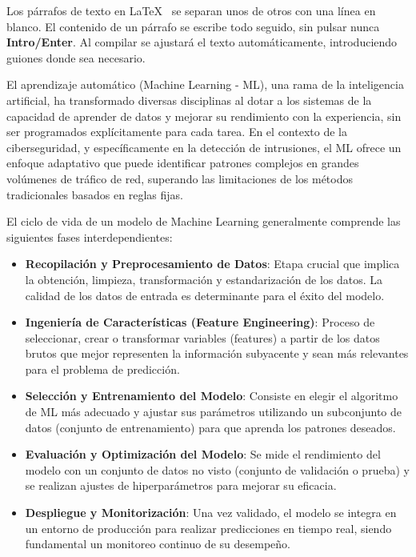 Los párrafos de texto en \LaTeX~ se separan unos de otros con una línea en blanco. El contenido de un párrafo se escribe todo seguido, sin pulsar nunca \textbf{Intro/Enter}. Al compilar se ajustará el texto automáticamente, introduciendo guiones donde sea necesario.

El aprendizaje automático (Machine Learning - ML), una rama de la inteligencia artificial, ha transformado diversas disciplinas al dotar a los sistemas de la capacidad de aprender de datos y mejorar su rendimiento con la experiencia, sin ser programados explícitamente para cada tarea. En el contexto de la ciberseguridad, y específicamente en la detección de intrusiones, el ML ofrece un enfoque adaptativo que puede identificar patrones complejos en grandes volúmenes de tráfico de red, superando las limitaciones de los métodos tradicionales basados en reglas fijas.

El ciclo de vida de un modelo de Machine Learning generalmente comprende las siguientes fases interdependientes:

\begin{itemize}
    
    \item\textbf{Recopilación y Preprocesamiento de Datos}: Etapa crucial que implica la obtención, limpieza, transformación y estandarización de los datos. La calidad de los datos de entrada es determinante para el éxito del modelo.
    
    \item\textbf{Ingeniería de Características (Feature Engineering)}: Proceso de seleccionar, crear o transformar variables (features) a partir de los datos brutos que mejor representen la información subyacente y sean más relevantes para el problema de predicción.
    
    \item\textbf{Selección y Entrenamiento del Modelo}: Consiste en elegir el algoritmo de ML más adecuado y ajustar sus parámetros utilizando un subconjunto de datos (conjunto de entrenamiento) para que aprenda los patrones deseados.
    
    \item\textbf{Evaluación y Optimización del Modelo}: Se mide el rendimiento del modelo con un conjunto de datos no visto (conjunto de validación o prueba) y se realizan ajustes de hiperparámetros para mejorar su eficacia.
    
    \item\textbf{Despliegue y Monitorización}: Una vez validado, el modelo se integra en un entorno de producción para realizar predicciones en tiempo real, siendo fundamental un monitoreo continuo de su desempeño.

\end{itemize}

